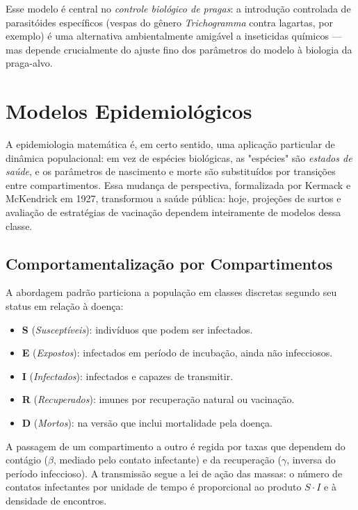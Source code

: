 Esse modelo é central no \emph{controle biológico de pragas}: a introdução
controlada de parasitóides específicos (vespas do gênero \textit{Trichogramma}
contra lagartas, por exemplo) é uma alternativa ambientalmente amigável a
inseticidas químicos --- mas depende crucialmente do ajuste fino dos parâmetros
do modelo à biologia da praga-alvo.


\section{Modelos Epidemiológicos}
\label{sec:10-epidemiologia}

A epidemiologia matemática é, em certo sentido, uma aplicação particular de
dinâmica populacional: em vez de espécies biológicas, as "espécies" são
\emph{estados de saúde}, e os parâmetros de nascimento e morte são substituídos
por transições entre compartimentos. Essa mudança de perspectiva, formalizada
por Kermack e McKendrick em 1927, transformou a saúde pública: hoje,
projeções de surtos e avaliação de estratégias de vacinação dependem
inteiramente de modelos dessa classe.

\subsection{Comportamentalização por Compartimentos}
\label{sub:image10-sir}

A abordagem padrão particiona a população em classes discretas segundo seu
status em relação à doença:
\begin{itemize}
\item \textbf{S} (\emph{Susceptíveis}): indivíduos que podem ser infectados.
\item \textbf{E} (\emph{Expostos}): infectados em período de incubação, ainda
  não infecciosos.
\item \textbf{I} (\emph{Infectados}): infectados e capazes de transmitir.
\item \textbf{R} (\emph{Recuperados}): imunes por recuperação natural ou
  vacinação.
\item \textbf{D} (\emph{Mortos}): na versão que inclui mortalidade pela doença.
\end{itemize}

A passagem de um compartimento a outro é regida por taxas que dependem do
contágio ($\beta$, mediado pelo contato infectante) e da recuperação ($\gamma$,
inversa do período infeccioso). A transmissão segue a lei de ação das massas:
o número de contatos infectantes por unidade de tempo é proporcional ao
produto $S \cdot I$ e à densidade de encontros.

